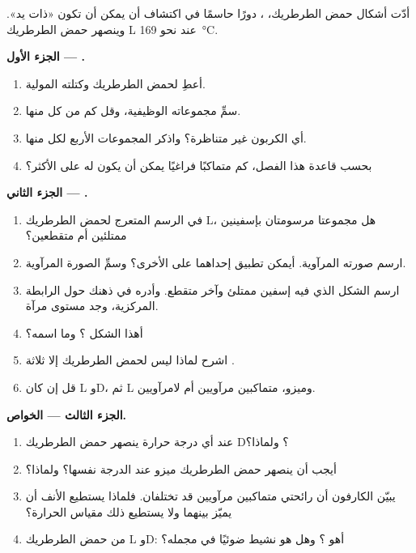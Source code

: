 \begin{problem}
\label{pb:g12:stereochemistry:1}
أدّت أشكال حمض الطرطريك، ، دورًا
حاسمًا في اكتشاف أن  يمكن أن تكون «ذات يد». وينصهر حمض الطرطريك L عند نحو \qty{169}{\celsius}.

\medskip
\noindent\textbf{الجزء الأول --- .}
\begin{enumerate}
  \item أعطِ  لحمض الطرطريك وكتلته المولية.
  \item سمِّ مجموعاته الوظيفية، وقل كم من كل منها.
  \item أي  الكربون غير متناظرة؟ واذكر المجموعات الأربع لكل منها.
  \item بحسب قاعدة هذا الفصل، كم متماكبًا فراغيًا يمكن أن يكون
        له على الأكثر؟
\end{enumerate}

\medskip
\noindent\textbf{الجزء الثاني --- .}
\begin{enumerate}[resume]
  \item في الرسم المتعرج لحمض الطرطريك L، هل مجموعتا 
        مرسومتان بإسفينين ممتلئين أم متقطعين؟
  \item ارسم صورته المرآوية. أيمكن تطبيق إحداهما على الأخرى؟ وسمِّ
        الصورة المرآوية.
  \item ارسم الشكل الذي فيه إسفين ممتلئ وآخر متقطع. وأدره في
        ذهنك حول الرابطة المركزية، وجد مستوى مرآة.
  \item أهذا الشكل ؟ وما اسمه؟
  \item اشرح لماذا ليس لحمض الطرطريك إلا ثلاثة .
  \item قل إن كان L وD، ثم L وميزو، متماكبين مرآويين أم
        لامرآويين.
\end{enumerate}

\medskip
\noindent\textbf{الجزء الثالث --- الخواص.}
\begin{enumerate}[resume]
  \item عند أي درجة حرارة ينصهر حمض الطرطريك D؟ ولماذا؟
  \item أيجب أن ينصهر حمض الطرطريك ميزو عند الدرجة نفسها؟ ولماذا؟
  \item يبيّن الكارفون أن رائحتي متماكبين مرآويين قد تختلفان. فلماذا
        يستطيع الأنف أن يميّز بينهما ولا يستطيع ذلك مقياس الحرارة؟
  \item {} من حمض الطرطريك L وD: أهو ؟ وهل هو نشيط ضوئيًا في مجمله؟
\end{enumerate}


\end{problem}
